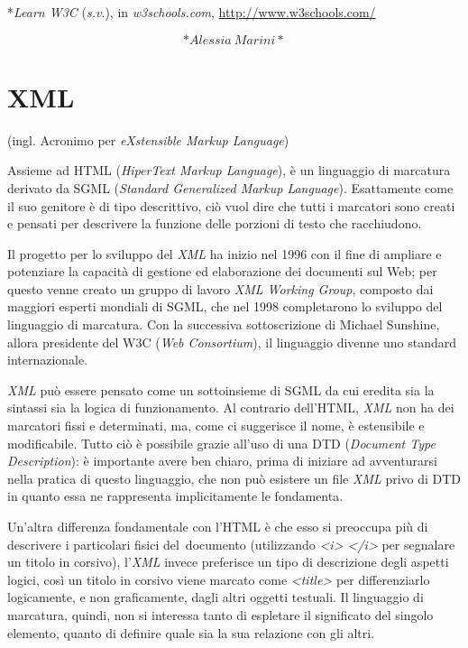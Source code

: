 \documentclass[
  b5paper,
  twoside,
  12pt,
  chapterprefix=false,
  bibliography=totocnumbered,
  parskip=false]{scrbook}
\begin{document}
*\emph{Learn W3C} (\emph{s.v}.), in \emph{w3schools.com},
\url{http://www.w3schools.com/}

\[*Alessia~Marini*\]

\hypertarget{xml}{%
\chapter{XML}\label{xml}}

(ingl. Acronimo per \emph{eXstensible Markup Language})

Assieme ad HTML (\emph{HiperText Markup Language}), è un linguaggio di
marcatura derivato da SGML (\emph{Standard Generalized Markup Language}).
Esattamente come il suo genitore è di tipo descrittivo, ciò vuol dire
che tutti i marcatori sono creati e pensati per descrivere la funzione
delle porzioni di testo che racchiudono.

Il progetto per lo sviluppo del \emph{XML} ha inizio nel 1996 con il fine di
ampliare e potenziare la capacità di gestione ed elaborazione dei
documenti sul Web; per questo venne creato un gruppo di lavoro \emph{XML
Working Group}, composto dai maggiori esperti mondiali di SGML, che nel
1998 completarono lo sviluppo del linguaggio di marcatura. Con la
successiva sottoscrizione di Michael Sunshine, allora presidente del W3C
(\emph{Web Consortium}), il linguaggio divenne uno standard internazionale.

\emph{XML} può essere pensato come un sottoinsieme di SGML da cui eredita sia
la sintassi sia la logica di funzionamento. Al contrario dell'HTML,
\emph{XML} non ha dei marcatori fissi e determinati, ma, come ci suggerisce
il nome, è estensibile e modificabile. Tutto ciò è possibile grazie
all'uso di una DTD (\emph{Document Type Description}): è importante avere ben
chiaro, prima di iniziare ad avventurarsi nella pratica di questo
linguaggio, che non può esistere un file \emph{XML} privo di DTD in quanto
essa ne rappresenta implicitamente le fondamenta.

Un'altra differenza fondamentale con l'HTML è che esso si preoccupa più
di descrivere i particolari fisici del~documento (utilizzando \emph{\textless i\textgreater{}
\textless/i\textgreater{}} per segnalare un titolo in corsivo), l'\emph{XML} invece preferisce
un tipo di descrizione degli aspetti logici, così un titolo in corsivo
viene marcato come \emph{\textless title\textgreater{}} per differenziarlo logicamente, e non
graficamente, dagli altri oggetti testuali. Il linguaggio di marcatura,
quindi, non si interessa tanto di espletare il significato del singolo
elemento, quanto di definire quale sia la sua relazione con gli altri.
\end{document}
